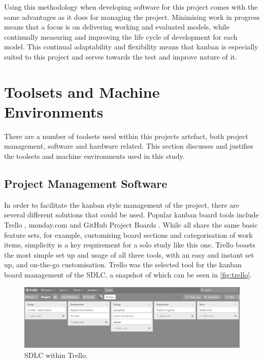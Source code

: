 Using this methodology when developing software for this project comes with the same advantages as it does for managing the project. Minimising work in progress means that a focus is on delivering working and evaluated models, while continually measuring and improving the life cycle of development for each model. This continual adaptability and flexibility means that kanban is especially suited to this project and serves towards the test and improve nature of it.

\section{Toolsets and Machine Environments}
There are a number of toolsets used within this projects artefact, both project management, software and hardware related. This section discusses and justifies the toolsets and machine environments used in this study.

\subsection{Project Management Software}
In order to facilitate the kanban style management of the project, there are several different solutions that could be used. Popular kanban board tools include Trello \citep{Trello41:online}, monday.com \citep{mondayco9:online} and GitHub Project Boards \citep{Aboutpro84:online}. While all share the same basic feature sets, for example, customising board sections and categorisation of work items, simplicity is a key requirement for a solo study like this one. Trello boasts the most simple set up and usage of all three tools, with an easy and instant set up, and on-the-go customisation. Trello was the selected tool for the kanban board management of the SDLC, a snapshot of which can be seen in \autoref{fig:trello}.

\begin{figure}[H]
    \centering
    \includegraphics[width=\textwidth]{figures/trello.png}
    \caption{SDLC within Trello.}
    \label{fig:trello}
\end{figure}

